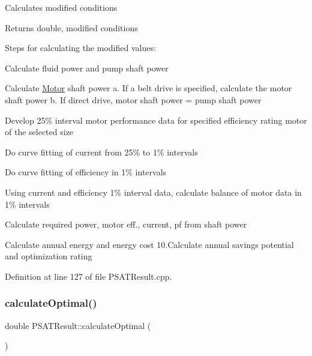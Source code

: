 Calculates modified conditions \begin{DoxyReturn}{Returns}
double, modified conditions 
\end{DoxyReturn}
Steps for calculating the modified values\+:
\begin{DoxyEnumerate}
\item Calculate fluid power and pump shaft power
\item Calculate \hyperlink{class_motor}{Motor} shaft power a. If a belt drive is specified, calculate the motor shaft power b. If direct drive, motor shaft power = pump shaft power
\item Develop 25\% interval motor performance data for specified efficiency rating motor of the selected size
\item Do curve fitting of current from 25\% to 1\% intervals
\item Do curve fitting of efficiency in 1\% intervals
\item Using current and efficiency 1\% interval data, calculate balance of motor data in 1\% intervals
\item Calculate required power, motor eff., current, pf from shaft power
\item Calculate annual energy and energy cost 10.\+Calculate annual savings potential and optimization rating
\end{DoxyEnumerate}

Definition at line 127 of file P\+S\+A\+T\+Result.\+cpp.

\mbox{\label{class_p_s_a_t_result_a25d50cd89b326f18449496a56d54f472}} 
\subsubsection{\texorpdfstring{calculate\+Optimal()}{calculateOptimal()}}
{\footnotesize\ttfamily double P\+S\+A\+T\+Result\+::calculate\+Optimal (\begin{DoxyParamCaption}{ }\end{DoxyParamCaption})}

